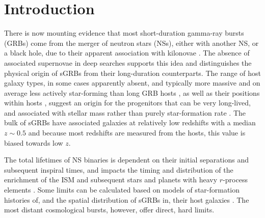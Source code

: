 \documentclass{aa}    %
\begin{document}
\section{Introduction}


There is now mounting evidence that most short-duration gamma-ray bursts (GRBs) come from the merger of neutron stars (NSs), either with another NS, or a black hole, due to their apparent association with kilonovae \citep{Barnes2013a, Tanvir2013b, Yang2015, Jin2016, Rosswog2016}. The absence of associated supernovae in deep searches \citep[e.g.][]{Hjorth2005a,Fox2005,Hjorth2005b} supports this idea and distinguishes the physical origin of sGRBs from their long-duration counterparts.
The range of host galaxy types, in some cases apparently absent, and typically more massive 
and on average less actively star-forming than long GRB hosts  \citep{Fong2013b}, as well as their positions within hosts \citep{Fong2013a}, suggest an origin for the progenitors that can be very long-lived, and associated with stellar mass rather than purely star-formation rate \citep{Berger2014}. The bulk of sGRBs have associated galaxies at relatively low redshifts with a median $z\sim0.5$ \citep{Berger2014} and because most redshifts are measured from the hosts, this value is biased towards low $z$.


The total lifetimes of NS binaries is dependent on their initial separations and subsequent inspiral times, and impacts the timing and distribution of the enrichment of the ISM and subsequent stars and planets with heavy $r$-process elements \citep{VandeVoort2015, Wallner2015,  Ji2016}. Some limits can be calculated based on models of star-formation histories of, and the spatial distribution of sGRBs in, their host galaxies \citep[][]{Berger2014}. The most distant cosmological bursts, however, offer direct, hard limits.
\end{document}
